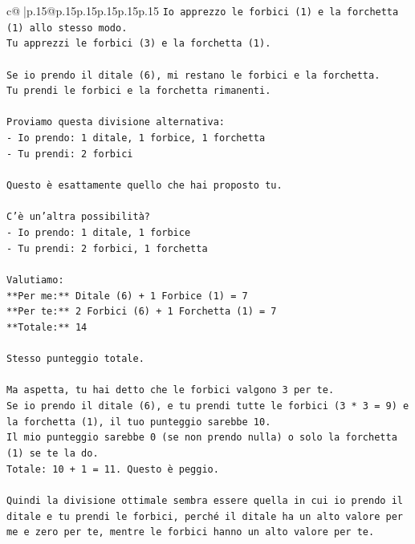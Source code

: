 \documentclass{article}
\begin{document}
{\begin{supertabular}{c@{$\;$}|p{.15\linewidth}@{}p{.15\linewidth}p{.15\linewidth}p{.15\linewidth}p{.15\linewidth}p{.15\linewidth}}
{{{\texttt{Io apprezzo le forbici (1) e la forchetta (1) allo stesso modo.} \\
\texttt{Tu apprezzi le forbici (3) e la forchetta (1).} \\
\\ 
\texttt{Se io prendo il ditale (6), mi restano le forbici e la forchetta.} \\
\texttt{Tu prendi le forbici e la forchetta rimanenti.} \\
\\ 
\texttt{Proviamo questa divisione alternativa:} \\
\texttt{{-} Io prendo: 1 ditale, 1 forbice, 1 forchetta} \\
\texttt{{-} Tu prendi: 2 forbici} \\
\\ 
\texttt{Questo è esattamente quello che hai proposto tu.} \\
\\ 
\texttt{C'è un'altra possibilità?} \\
\texttt{{-} Io prendo: 1 ditale, 1 forbice} \\
\texttt{{-} Tu prendi: 2 forbici, 1 forchetta} \\
\\ 
\texttt{Valutiamo:} \\
\texttt{**Per me:** Ditale (6) + 1 Forbice (1) = 7} \\
\texttt{**Per te:** 2 Forbici (6) + 1 Forchetta (1) = 7} \\
\texttt{**Totale:** 14} \\
\\ 
\texttt{Stesso punteggio totale.} \\
\\ 
\texttt{Ma aspetta, tu hai detto che le forbici valgono 3 per te.} \\
\texttt{Se io prendo il ditale (6), e tu prendi tutte le forbici (3 * 3 = 9) e la forchetta (1), il tuo punteggio sarebbe 10.} \\
\texttt{Il mio punteggio sarebbe 0 (se non prendo nulla) o solo la forchetta (1) se te la do.} \\
\texttt{Totale: 10 + 1 = 11. Questo è peggio.} \\
\\ 
\texttt{Quindi la divisione ottimale sembra essere quella in cui io prendo il ditale e tu prendi le forbici, perché il ditale ha un alto valore per me e zero per te, mentre le forbici hanno un alto valore per te.} \\
\\ 
}}}
\end{supertabular}}
\end{document}
